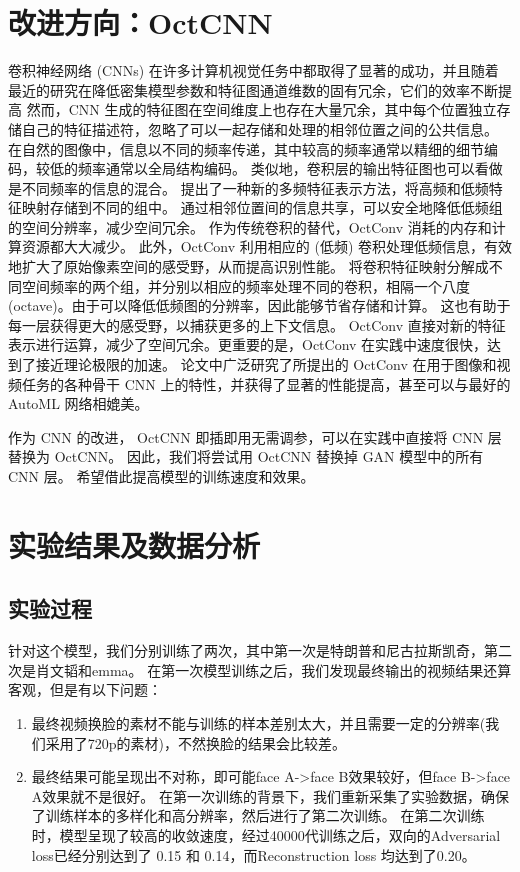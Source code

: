 \chapter{改进方向：OctCNN}
卷积神经网络 (CNNs) 在许多计算机视觉任务中都取得了显著的成功，并且随着最近的研究在降低密集模型参数和特征图通道维数的固有冗余，它们的效率不断提高
然而，CNN 生成的特征图在空间维度上也存在大量冗余，其中每个位置独立存储自己的特征描述符，忽略了可以一起存储和处理的相邻位置之间的公共信息。
在自然的图像中，信息以不同的频率传递，其中较高的频率通常以精细的细节编码，较低的频率通常以全局结构编码。
类似地，卷积层的输出特征图也可以看做是不同频率的信息的混合。
 提出了一种新的多频特征表示方法，将高频和低频特征映射存储到不同的组中。
通过相邻位置间的信息共享，可以安全地降低低频组的空间分辨率，减少空间冗余。
作为传统卷积的替代，OctConv 消耗的内存和计算资源都大大减少。
此外，OctConv 利用相应的 (低频) 卷积处理低频信息，有效地扩大了原始像素空间的感受野，从而提高识别性能。
将卷积特征映射分解成不同空间频率的两个组，并分别以相应的频率处理不同的卷积，相隔一个八度 (octave)。由于可以降低低频图的分辨率，因此能够节省存储和计算。
这也有助于每一层获得更大的感受野，以捕获更多的上下文信息。
OctConv 直接对新的特征表示进行运算，减少了空间冗余。更重要的是，OctConv 在实践中速度很快，达到了接近理论极限的加速。
论文中广泛研究了所提出的 OctConv 在用于图像和视频任务的各种骨干 CNN 上的特性，并获得了显著的性能提高，甚至可以与最好的 AutoML 网络相媲美。


作为 CNN 的改进， OctCNN 即插即用无需调参，可以在实践中直接将 CNN 层替换为 OctCNN。
因此，我们将尝试用 OctCNN 替换掉 GAN 模型中的所有 CNN 层。
希望借此提高模型的训练速度和效果。

\chapter{实验结果及数据分析}
\label{experiments}

\section{实验过程}
针对这个模型，我们分别训练了两次，其中第一次是特朗普和尼古拉斯凯奇，第二次是肖文韬和emma。
在第一次模型训练之后，我们发现最终输出的视频结果还算客观，但是有以下问题：

\begin{enumerate}
	\item 最终视频换脸的素材不能与训练的样本差别太大，并且需要一定的分辨率(我们采用了720p的素材)，不然换脸的结果会比较差。
	\item 最终结果可能呈现出不对称，即可能face A->face B效果较好，但face B->face A效果就不是很好。
	在第一次训练的背景下，我们重新采集了实验数据，确保了训练样本的多样化和高分辨率，然后进行了第二次训练。
	在第二次训练时，模型呈现了较高的收敛速度，经过40000代训练之后，双向的Adversarial loss已经分别达到了 0.15 和 0.14，而Reconstruction loss 均达到了0.20。
\end{enumerate}

